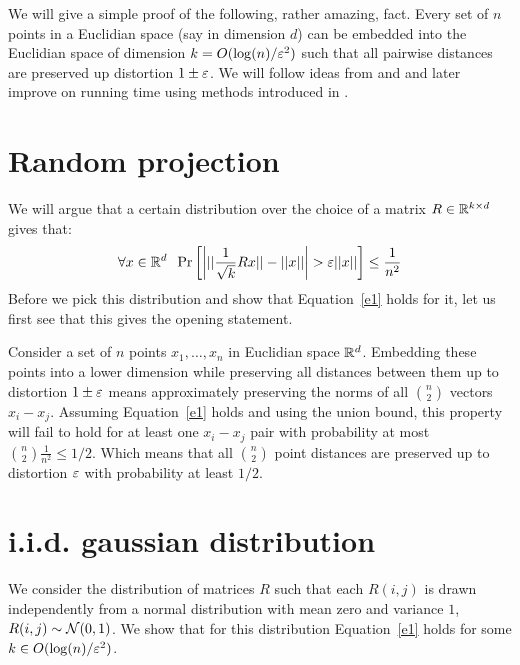 \documentclass{article}
\begin{document}

We will give a simple proof of the following, rather amazing, fact. Every set of $n$ points 
in a Euclidian space (say in dimension $d$) can be embedded into the Euclidian space of 
dimension $k = O(\log(n)/\varepsilon^2)$ such that all pairwise distances are preserved up distortion $1\pm \varepsilon$.
We will follow ideas from \cite{JL84} and \cite{DasGuptaGupta99} and later improve on running time using 
methods introduced in \cite{AilonCh06}.

\section*{Random projection}
We will argue that a certain distribution over the choice of a matrix $R \in {\mathbb{R}}^{k \times d}$ gives that:
\begin{equation}
\label{e1}
\forall x \in {\mathbb{R}}^{d} \;\; \Pr\left[ \left| ||\frac{1}{\sqrt{k}}Rx|| - ||x|| \right| > \varepsilon||x|| \right] \le \frac{1}{n^2} 
\end{equation}
Before we pick this distribution and show that Equation~\ref{e1} holds for it, let us first see
that this gives the opening statement. 

Consider a set of $n$ points $x_1,\ldots, x_n$ in Euclidian space ${\mathbb{R}}^d$. Embedding these points
into a lower dimension while preserving all distances between
them up to distortion $1\pm \varepsilon$ means approximately preserving the norms of all 
${n \choose 2}$ vectors $x_i - x_j$. Assuming Equation~\ref{e1} holds and using the union 
bound, this property will fail to hold for at least one $x_i - x_j$ pair with probability at most ${n \choose 2}\frac{1}{n^2} \le 1/2$.
Which means that all ${n \choose 2}$ point distances are preserved up to distortion $\varepsilon$ with probability at least $1/2$.


\section{i.i.d. gaussian distribution}
We consider the distribution of matrices $R$ such that each $R(i,j)$ is drawn independently from  a
normal distribution with mean zero and variance $1$, $R(i,j) \sim {\mathcal{N}}(0,1)$. We show that for this
distribution Equation~\ref{e1} holds for some $k \in O(\log(n)/\varepsilon^2)$.
\end{document}
